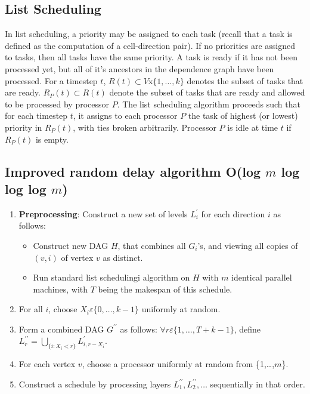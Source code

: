 \documentclass[11pt, letterpaper,titlepage,oneside]{article}
\begin{document}
\subsection*{List Scheduling}

In list scheduling, a priority may be assigned to each task (recall that a task is defined as the computation of a cell-direction pair). If no priorities are assigned to tasks, then all tasks have the same priority. A task is ready if it has not been processed yet, but all of it's ancestors in the dependence graph have been processed. For a timestep $t$, $R(t)\subset V\text{x}\{1,\ldots,k\}$ denotes the subset of tasks that are ready. $R_P(t)\subset R(t)$ denote the subset of tasks that are ready and allowed to be processed by processor $P$. The list scheduling algorithm proceeds such that for each timestep $t$, it assigns to each processor $P$ the task of highest (or lowest) priority in $R_P(t)$, with ties broken arbitrarily. Processor $P$ is idle at time $t$ if $R_P(t)$ is empty. 

\subsection*{Improved random delay algorithm O(log $m$ log log log $m$)}
\begin{enumerate}
\item \textbf{Preprocessing}: Construct a new set of levels $L_i^{\prime}$ for each direction $i$ as follows:
\begin{itemize}
\item Construct new DAG $H$, that combines all $G_i$'s, and viewing all copies of $(v,i)$ of vertex $v$ as distinct.
\item Run standard list schedulingi algorithm on $H$ with $m$ identical parallel machines, with $T$ being the makespan of this schedule.
\end{itemize}
\item For all $i$, choose $X_i \varepsilon \{0,\ldots,k-1\}$ uniformly at random.
\item Form a combined DAG $G^{\prime\prime}$ as follows: $\forall r \varepsilon \{1,\ldots,T+k-1\}$, define $L_r^{\prime\prime} = \bigcup_{\{i:X_i<r\}}L^\prime_{i,r-X_i}$.
\item For each vertex $v$, choose a processor uniformly at random from \{1,\ldots,$m$\}.
\item Construct a schedule by processing layers $L_1^{\prime\prime},L_2^{\prime\prime},\ldots$ sequentially in that order.
\end{enumerate}
\end{document}
